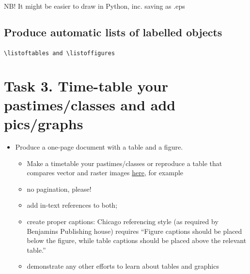 \documentclass[a4paper,11pt]{article}
\begin{document}
NB! It might be easier to draw in Python, inc. saving as .eps

\subsection{Produce automatic lists of labelled objects}

\verb|\listoftables and \listoffigures|

\listoftables
\listoffigures

\section*{Task 3. Time-table your pastimes/classes and add pics/graphs}
\label{task}

\begin{tcolorbox}[width=\textwidth, colback={yellow!40!white}, title={}, colbacktitle=yellow!60!white, coltitle=black]
	\begin{itemize}
		\item Produce a one-page document with a table and a figure. 
		\begin{itemize}
			\item Make a timetable your pastimes/classes or reproduce a table that compares vector and raster images \href{https://tinyurl.com/yf8orxog}{here}, for example
			\item no pagination, please!
			\item add in-text references to both;
			\item create proper captions: Chicago referencing style (as required by Benjamins  Publishing house) requires ``Figure captions should be placed below the figure, while table captions should be placed above the relevant table.''
			\item demonstrate any other efforts to learn about tables and graphics 
		\end{itemize} 
	\end{itemize}
	
\end{tcolorbox}%
\end{document}
